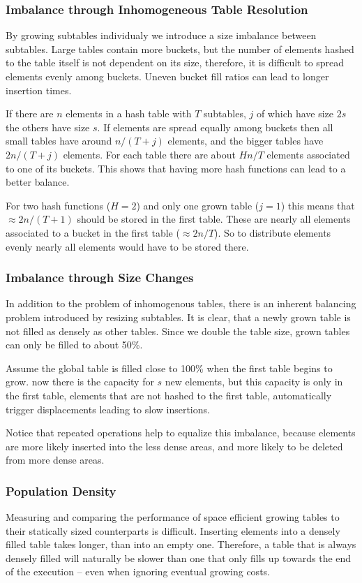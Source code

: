 \documentclass[a4paper,UKenglish]{lipics-v2016}
\begin{document}
\subsubsection*{Imbalance through Inhomogeneous Table Resolution}
\label{sec:inhom_res}
By growing subtables individualy we introduce a size imbalance
between subtables.  Large tables contain more buckets, but the number
of elements hashed to the table itself is not dependent on its size,
therefore, it is difficult to spread elements evenly among buckets.
Uneven bucket fill ratios can lead to longer insertion times.

If there are $n$ elements in a hash table with $T$ subtables,
$j$ of which have size $2s$ the others have size $s$. If elements are
spread equally among buckets then all small tables have around
$n/(T+j)$ elements, and the bigger tables have $2n/(T+j)$ elements.
For each table there are about $Hn/T$ elements associated to one of
its buckets.  This shows that having more hash functions can lead to a
better balance.

For two hash functions ($H=2$) and only one grown table ($j=1$) this
means that $\approx 2n/(T+1)$ should be stored in the first table.
These are nearly all elements associated to a bucket in the first
table ($\approx 2n/T$). So to distribute elements evenly nearly all
elements would have to be stored there.

\subsubsection*{Imbalance through Size Changes}
In addition to the problem of inhomogenous tables, there is an
inherent balancing problem introduced by resizing subtables. It is
clear, that a newly grown table is not filled as densely as other
tables.  Since we double the table size, grown tables can only be
filled to about 50\%.

Assume the global table is filled close to 100\% when the first table begins
to grow.  now there is the capacity for $s$ new elements, but this
capacity is only in the first table, elements that are not hashed to
the first table, automatically trigger displacements leading to slow
insertions.

Notice that repeated operations help to equalize this imbalance,
because elements are more likely inserted into the less dense areas,
and more likely to be deleted from more dense areas.

\subsubsection*{Population Density}
Measuring and comparing the performance of space efficient growing
tables to their statically sized counterparts is difficult.  Inserting
elements into a densely filled table takes longer, than into an empty
one.  Therefore, a table that is always densely filled will naturally
be slower than one that only fills up towards the end of the
execution -- even when ignoring eventual growing costs.
\end{document}
